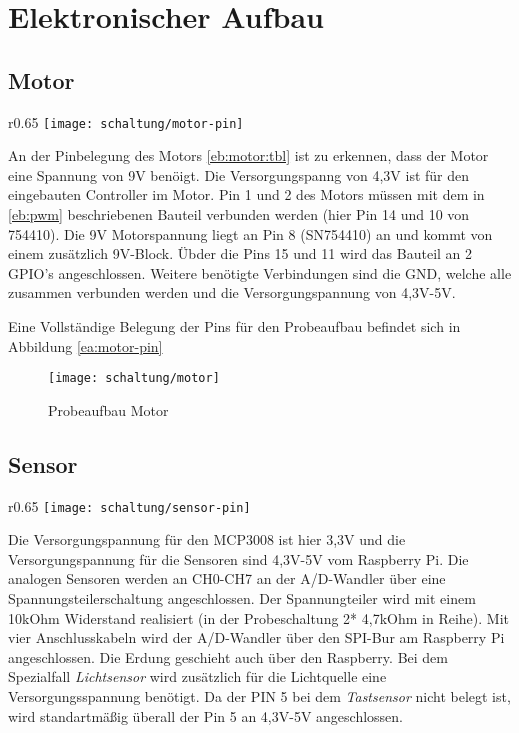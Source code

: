 \section{Elektronischer Aufbau}

\subsection{Motor}
\begin{wrapfigure}{r}{0.65\textwidth}
\texttt{[image: schaltung/motor-pin]}
\caption{GPIO Belegung Motor}
\label{ea:motor-pin}
\end{wrapfigure}
An der Pinbelegung des Motors \ref{eb:motor:tbl} ist zu erkennen, dass der Motor eine Spannung von 9V benöigt. Die Versorgungspanng von 4,3V ist für den eingebauten Controller im Motor. Pin 1 und 2 des Motors müssen mit dem in \ref{eb:pwm} beschriebenen Bauteil verbunden werden (hier Pin 14 und 10 von 754410). Die 9V Motorspannung liegt an Pin 8 (SN754410) an und kommt von einem zusätzlich 9V-Block. Übder die Pins 15 und 11 wird das Bauteil an 2 GPIO's angeschlossen. Weitere benötigte Verbindungen sind die GND, welche alle zusammen verbunden werden und die Versorgungspannung von 4,3V-5V.

Eine Vollständige Belegung der Pins für den Probeaufbau befindet sich in Abbildung \ref{ea:motor-pin}

\begin{figure}[h]
  \centering
  \texttt{[image: schaltung/motor]}
  \caption{Probeaufbau Motor}
  \label{schaltung:motor}
\end{figure}

\subsection{Sensor}
\begin{wrapfigure}{r}{0.65\textwidth}
\texttt{[image: schaltung/sensor-pin]}
\caption{GPIO Belegung Sensor}
\label{ea:sensor-pin}
\end{wrapfigure}

Die Versorgungspannung für den MCP3008 ist hier 3,3V und die Versorgungspannung für die Sensoren sind 4,3V-5V vom Raspberry Pi. Die analogen Sensoren werden an CH0-CH7 an der A/D-Wandler über eine Spannungsteilerschaltung angeschlossen. Der Spannungteiler wird mit einem 10kOhm Widerstand realisiert (in der Probeschaltung 2* 4,7kOhm in Reihe). Mit vier Anschlusskabeln wird der A/D-Wandler über den SPI-Bur am Raspberry Pi angeschlossen. Die Erdung geschieht auch über den Raspberry. Bei dem Spezialfall \emph{Lichtsensor} wird zusätzlich für die Lichtquelle eine Versorgungsspannung benötigt. Da der PIN 5 bei dem \emph{Tastsensor} nicht belegt ist, wird standartmäßig überall der Pin 5 an 4,3V-5V angeschlossen.

